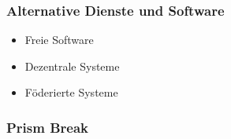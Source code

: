 \documentclass[12pt]{beamer}
\begin{document}
\begin{frame}
  \frametitle{Alternative Dienste und Software}
  \begin{itemize}
    \item<2-> Freie Software
    \item<3-> Dezentrale Systeme
    \item<4-> Föderierte Systeme
  \end{itemize}
\end{frame}

\begin{frame}
  \frametitle{Prism Break}
  \begin{center}
  \end{center}
\end{frame}
\end{document}
